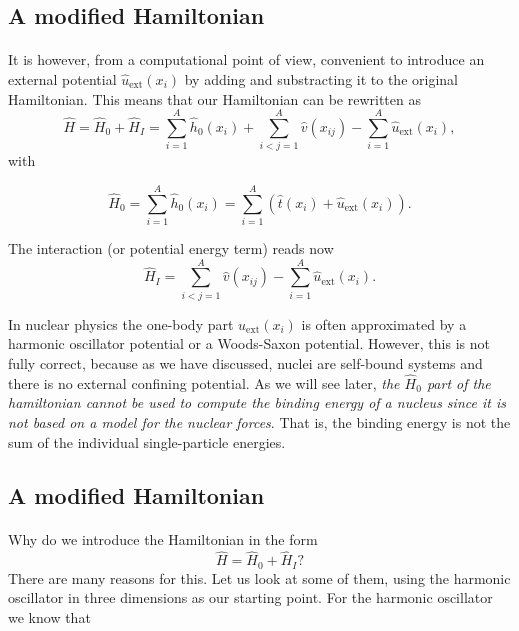 \documentclass[%
twoside,                 %
final,                   %
10pt]{article}
\begin{document}
\subsection*{A modified Hamiltonian}

\paragraph{}
It is however, from a computational point of view, convenient to introduce an external potential $\hat{u}_{\mathrm{ext}}(x_i)$ by adding and substracting it to the original Hamiltonian. 
This means that our Hamiltonian can be rewritten as 
\[
    \hat{H} = \hat{H}_0 + \hat{H}_I 
    = \sum_{i=1}^A \hat{h}_0(x_i) + \sum_{i < j=1}^A \hat{v}(x_{ij})-\sum_{i=1}^A\hat{u}_{\mathrm{ext}}(x_i),
\]
with

\[
  \hat{H}_0=\sum_{i=1}^A \hat{h}_0(x_i) =  \sum_{i=1}^A\left(\hat{t}(x_i) + \hat{u}_{\mathrm{ext}}(x_i)\right).
\]

The interaction (or potential energy term) reads now
\[
  \hat{H}_I=  \sum_{i < j=1}^A \hat{v}(x_{ij})-\sum_{i=1}^A\hat{u}_{\mathrm{ext}}(x_i).
\]

In nuclear physics the one-body part $u_{\mathrm{ext}}(x_i)$ is often approximated by a harmonic oscillator potential or a
Woods-Saxon potential. However, this is not fully correct, because as we have discussed, nuclei are self-bound systems and there is no external confining potential. As we will see later, \emph{the $\hat{H}_0$ part of the hamiltonian cannot be used to compute the binding energy of a nucleus since it is not based on a model for the nuclear forces}. That is, the binding energy is not the sum of the individual single-particle energies.




\subsection*{A modified Hamiltonian}

\paragraph{}
Why do we introduce the  Hamiltonian  in the form
\[
    \hat{H} = \hat{H}_0 + \hat{H}_I? 
\]
There are many reasons for this. Let us look at some of them, using the harmonic oscillator in three dimensions as our starting point. For the harmonic oscillator we know that
\end{document}

